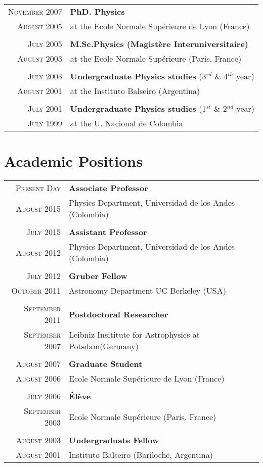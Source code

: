 \documentclass[a4paper,10pt]{article} %
\begin{document}
\begin{tabular}{rl}	
\textsc{November 2007} & {\bf PhD. Physics}\\
\textsc{August 2005}& at the Ecole Normale Sup\'erieure de Lyon (France) \\
&\\
\textsc{July 2005} & {\bf M.Sc.Physics (Magist\`ere Interuniversitaire)}\\  
\textsc{August 2003}& at the Ecole Normale Sup\'erieure (Paris, France) \\
&\\
\textsc{July 2003} & {\bf Undergraduate Physics studies} (3$^{rd}$ \& 4$^{th}$ year)\\
\textsc{August 2001} & at the Instituto Balseiro (Argentina)\\
&\\
\textsc{July 2001}  & {\bf Undergraduate Physics studies} (1$^{st}$ \& 2$^{nd}$ year)\\
\textsc{July 1999}& at the U. Nacional de Colombia\\
\end{tabular}

\color{red}
\section{Academic Positions}
\color{black}

\begin{tabular}{rl}	
 \textsc{Present Day} &  {\bf Associate Professor}\\
 \textsc{August 2015} & Physics Department, Universidad de los Andes (Colombia) \\
& \\
 \textsc{July 2015} &  {\bf Assistant Professor}\\
 \textsc{August 2012} & Physics Department, Universidad de los Andes (Colombia) \\
&\\
 \textsc{July 2012} &  {\bf Gruber Fellow}\\
 \textsc{October 2011} & Astronomy Department UC Berkeley (USA) \\
&\\
 \textsc{September 2011} &  {\bf Postdoctoral Researcher}\\
 \textsc{September 2007} & Leibniz Insititute for Astrophysics at Potsdam(Germany) \\ 
&\\
 \textsc{August 2007} &  {\bf Graduate Student}\\
 \textsc{August 2006} & Ecole Normale Sup\'erieure de Lyon (France)\\
&\\
 \textsc{July 2006} &  {\bf \'El\`eve}\\
 \textsc{September 2003} & Ecole Normale Sup\'erieure (Paris, France)\\
&\\
 \textsc{August 2003} &  {\bf Undergraduate Fellow}\\
 \textsc{August 2001} & Instituto Balseiro (Bariloche, Argentina)\\
\end{tabular}
\end{document}
